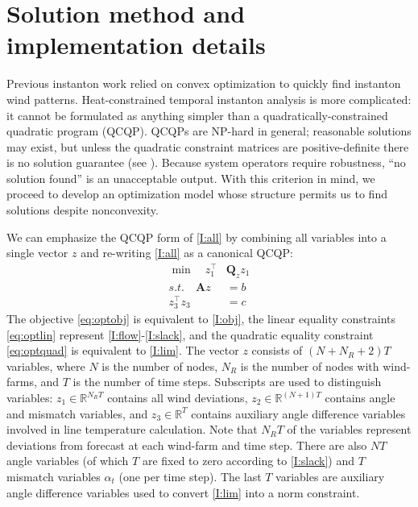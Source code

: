 \documentclass[conference]{IEEEtran}
\begin{document}
\section{Solution method and implementation details}\label{sec:solution}

Previous instanton work relied on convex optimization to quickly find instanton wind patterns. Heat-constrained temporal instanton analysis is more complicated:  it cannot be formulated as anything simpler than a quadratically-constrained quadratic program (QCQP). QCQPs are NP-hard in general; reasonable solutions may exist, but unless the quadratic constraint matrices are positive-definite there is no solution guarantee (see \cite{mehanna2014}). Because system operators require robustness, ``no solution found'' is an unacceptable output. With this criterion in mind, we proceed to develop an optimization model whose structure permits us to find solutions despite nonconvexity.

We can emphasize the QCQP form of \eqref{I:all} by combining all variables into a single vector $z$ and re-writing \eqref{I:all} as a canonical QCQP:
\begin{subequations}\label{eq:opt}
\begin{align}
\label{eq:optobj} \min\quad z_1^\top &\mathbf{Q}_z z_1 \\
\label{eq:optlin}s.t.\quad \mathbf{A}z &= b \\
\label{eq:optquad}z_3^\top z_3 &= c
\end{align}
\end{subequations}
The objective \eqref{eq:optobj} is equivalent to \eqref{I:obj}, the
linear equality constraints \eqref{eq:optlin} represent
\eqref{I:flow}-\eqref{I:slack}, and the quadratic equality constraint
\eqref{eq:optquad} is equivalent to \eqref{I:lim}. The vector $z$
consists of $(N+N_R+2)T$ variables, where $N$ is the number of nodes,
$N_R$ is the number of nodes with wind-farms, and $T$ is the number of
time steps. Subscripts are used to distinguish variables: $z_1\in\mathbb{R}^{N_RT}$ contains all wind deviations, $z_2\in\mathbb{R}^{(N+1)T}$ contains angle and mismatch variables, and $z_3\in\mathbb{R}^T$ contains auxiliary angle difference variables involved in line temperature calculation. Note that $N_RT$ of the variables represent deviations from forecast at each wind-farm and time step. There are also $NT$ angle variables (of which $T$ are fixed to zero according to \eqref{I:slack}) and $T$ mismatch variables $\alpha_t$ (one per time step). The last $T$ variables are auxiliary angle difference variables used to convert \eqref{I:lim} into a norm constraint.
\end{document}
